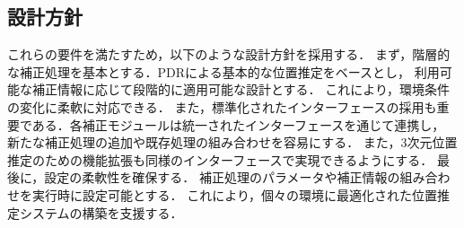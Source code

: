 \subsection{設計方針}
これらの要件を満たすため，以下のような設計方針を採用する．
まず，階層的な補正処理を基本とする．PDRによる基本的な位置推定をベースとし，
利用可能な補正情報に応じて段階的に適用可能な設計とする．
これにより，環境条件の変化に柔軟に対応できる．
また，標準化されたインターフェースの採用も重要である．各補正モジュールは統一されたインターフェースを通じて連携し，
新たな補正処理の追加や既存処理の組み合わせを容易にする．
また，3次元位置推定のための機能拡張も同様のインターフェースで実現できるようにする．
最後に，設定の柔軟性を確保する．
補正処理のパラメータや補正情報の組み合わせを実行時に設定可能とする．
これにより，個々の環境に最適化された位置推定システムの構築を支援する．

